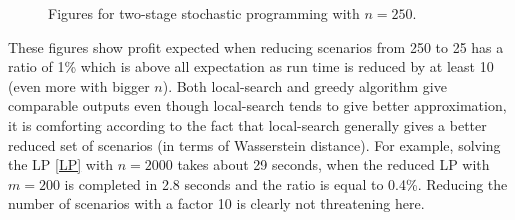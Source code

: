 \documentclass{amsart}
\begin{document}
\begin{figure}[ht]
    \centering
    \hfill
    \hfill
    \caption{Figures for two-stage stochastic programming with $n=250$.}
\end{figure}

These figures show profit expected when reducing scenarios from 250 to 25 has a ratio of 1\% which is above all expectation as run time is reduced by at least 10 (even more with bigger $n$). Both local-search and greedy algorithm give comparable outputs even though local-search tends to give better approximation, it is comforting according to the fact that local-search generally gives a better reduced set of scenarios (in terms of Wasserstein distance). For example, solving the LP \ref{LP}  with $n=2000$ takes about 29 seconds, when the reduced LP with $m=200$ is completed in 2.8 seconds and the ratio is equal to 0.4\%. Reducing the number of scenarios with a factor 10 is clearly not threatening here.

\clearpage
\appendix
\end{document}
